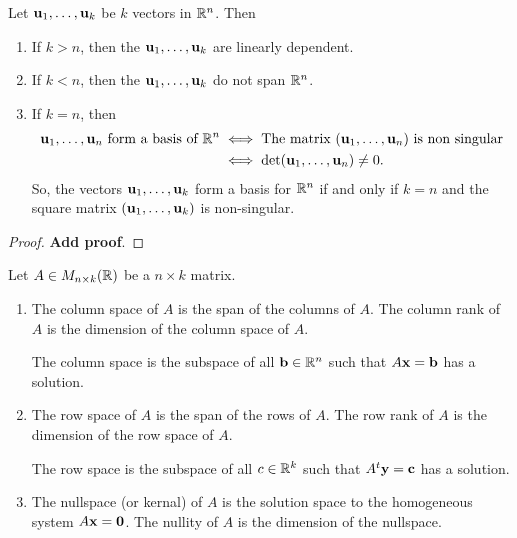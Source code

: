 \documentclass[10pt, a4paper]{article}
\begin{document}
\begin{theorem}
    Let $\mathbf{u}_1, \dotsc, \mathbf{u}_k$ be $k$ vectors in $\mathbb{R} ^ n$.
    Then
    \begin{enumerate}[label = (\roman*)]
        \item If $k > n$,
        then the $\mathbf{u}_1, \dotsc, \mathbf{u}_k$ are linearly dependent.
        \item If $k < n$,
        then the $\mathbf{u}_1, \dotsc, \mathbf{u}_k$ do not span $\mathbb{R} ^ n$.
        \item If $k = n$,
        then
        \begin{align*}
            \mathbf{u}_1, \dotsc, \mathbf{u}_n\text{ form a basis of } \mathbb{R} ^ n &\iff\text{The matrix $(\mathbf{u}_1, \dotsc, \mathbf{u}_n)$ is non singular} \\
            &\iff \det(\mathbf{u}_1, \dotsc, \mathbf{u}_n) \neq 0.
        \end{align*}
        So,
        the vectors $\mathbf{u}_1, \dotsc, \mathbf{u}_k$ form a basis for $\mathbb{R} ^ n$ if and only if $k = n$ and the square matrix $(\mathbf{u}_1, \dotsc, \mathbf{u}_k)$ is non-singular.
    \end{enumerate}
    \begin{proof}
        \textbf{Add proof}.
    \end{proof}
\end{theorem}

\begin{definition}
    Let $A \in M_{n \times k}(\mathbb{R})$ be a $n \times k$ matrix.
    \begin{enumerate}[label = (\roman*)]
        \item The column space of $A$ is the span of the columns of $A$.
        The column rank of $A$ is the dimension of the column space of $A$.

        The column space is the subspace of all $\mathbf{b} \in \mathbb{R} ^ n$ such that $A\mathbf{x} = \mathbf{b}$ has a solution.

        \item The row space of $A$ is the span of the rows of $A$.
        The row rank of $A$ is the dimension of the row space of $A$.

        The row space is the subspace of all $c \in \mathbb{R} ^ k$ such that $A ^ t\mathbf{y} = \mathbf{c}$ has a solution.

        \item The nullspace
        (or kernal)
        of $A$ is the solution space to the homogeneous system $A\mathbf{x} = \mathbf{0}$.
        The nullity of $A$ is the dimension of the nullspace.
    \end{enumerate}
\end{definition}
\end{document}
